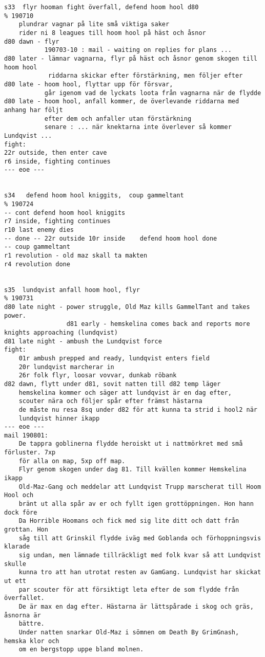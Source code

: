 \begin{verbatim}
s33  flyr hooman fight överfall, defend hoom hool d80                   % 190710
    plundrar vagnar på lite små viktiga saker
    rider ni 8 leagues till hoom hool på häst och åsnor
d80 dawn - flyr
           190703-10 : mail - waiting on replies for plans ...
d80 later - lämnar vagnarna, flyr på häst och åsnor genom skogen till hoom hool
            riddarna skickar efter förstärkning, men följer efter
d80 late - hoom hool, flyttar upp för försvar,
           går igenom vad de lyckats loota från vagnarna när de flydde
d80 late - hoom hool, anfall kommer, de överlevande riddarna med anhang har följt
           efter dem och anfaller utan förstärkning
           senare : ... när knektarna inte överlever så kommer Lundqvist ...
fight:
22r outside, then enter cave
r6 inside, fighting continues
--- eoe ---


s34   defend hoom hool kniggits,  coup gammeltant                       % 190724
-- cont defend hoom hool kniggits
r7 inside, fighting continues
r10 last enemy dies
-- done -- 22r outside 10r inside    defend hoom hool done
-- coup gammeltant
r1 revolution - old maz skall ta makten
r4 revolution done


s35  lundqvist anfall hoom hool, flyr                                   % 190731
d80 late night - power struggle, Old Maz kills GammelTant and takes power. 
                 d81 early - hemskelina comes back and reports more knights approaching (lundqvist)
d81 late night - ambush the Lundqvist force
fight:
    01r ambush prepped and ready, lundqvist enters field
    20r lundqvist marcherar in
    26r folk flyr, loosar vovvar, dunkab röbank
d82 dawn, flytt under d81, sovit natten till d82 temp läger
    hemskelina kommer och säger att lundqvist är en dag efter, 
    scouter nära och följer spår efter främst hästarna
    de måste nu resa 8sq under d82 för att kunna ta strid i hool2 när 
    lundqvist hinner ikapp
--- eoe ---
mail 190801:
    De tappra goblinerna flydde heroiskt ut i nattmörkret med små förluster. 7xp
    för alla on map, 5xp off map.
    Flyr genom skogen under dag 81. Till kvällen kommer Hemskelina ikapp
    Old-Maz-Gang och meddelar att Lundqvist Trupp marscherat till Hoom Hool och
    bränt ut alla spår av er och fyllt igen grottöppningen. Hon hann dock före 
    Da Horrible Hoomans och fick med sig lite ditt och datt från grottan. Hon 
    såg till att Grinskil flydde iväg med Goblanda och förhoppningsvis klarade 
    sig undan, men lämnade tillräckligt med folk kvar så att Lundqvist skulle
    kunna tro att han utrotat resten av GamGang. Lundqvist har skickat ut ett 
    par scouter för att försiktigt leta efter de som flydde från överfallet. 
    De är max en dag efter. Hästarna är lättspårade i skog och gräs, åsnorna är
    bättre.
    Under natten snarkar Old-Maz i sömnen om Death By GrimGnash, hemska klor och
    om en bergstopp uppe bland molnen.



\end{verbatim}
